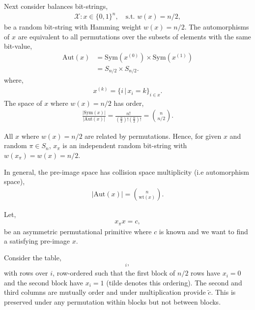 \documentclass[twocolumn, aps, amsmath, amssymb, nofootinbib, superscriptaddress, longbibliography, doublefloatfix, table-of-contents, eqsecnum, rmp]{revtex4-2}
\makeatletter
\newcommand{\soplus}{{{\hspace{1pt}}{\mathbin{\mathpalette\make@small{\mathbin\oplus}}}}{\hspace{1pt}}}
\newcommand{\make@small}[2]{%
  \vcenter{\hbox{%
    \scalebox{0.6}{$\m@th#1#2$}%
  }}%
}
\makeatother
\begin{document}
Next consider balances bit-strings,
\begin{align}
	\mathcal{X}: x\in\{0,1\}^n,\quad \mathrm{s.t.}\,\,w(x)=n/2,
\end{align}
be a random bit-string with Hamming weight \mbox{$w(x)=n/2$}. The automorphisms of $x$ are equivalent to all permutations over the subsets of elements with the same bit-value,
\begin{align}
	\mathrm{Aut}(x) &= \mathrm{Sym}(x^{(0)}) \times \mathrm{Sym}(x^{(1)}) \nonumber\\
	&= S_{n/2}\times S_{n/2}.
\end{align}
where,
\begin{align}
	x^{(k)}=\{i\,|\, x_i=k\}_{i\in x}.
\end{align}
The space of $x$ where $w(x)=n/2$ has order,
\begin{align}
	\frac{|\mathrm{Sym}(x)|}{|\mathrm{Aut}(x)|} = \frac{n!}{(\frac{n}{2})!(\frac{n}{2})!} = \binom{n}{n/2}.
\end{align}

All $x$ where $w(x)=n/2$ are related by permutations. Hence, for given $x$ and random $\pi\in S_n$, $x_\pi$ is an independent random bit-string with $w(x_\pi)=w(x)=n/2$.

In general, the pre-image space has collision space multiplicity (i.e automorphism space),
\begin{align}
	|\mathrm{Aut}(x)| = \binom{n}{\mathrm{wt}(x)}.
\end{align}


Let,
\begin{align}
	x_\pi x = c,
\end{align}
be an asymmetric permutational primitive where $c$ is known and we want to find a satisfying pre-image $x$.

Consider the table,
\begin{align}
	[x_\pi,\tilde{x},\tilde{x}\soplus \tilde{c}]_i,
\end{align}
with rows over $i$, row-ordered such that the first block of $n/2$ rows have $x_i=0$ and the second block have $x_i=1$ (tilde denotes this ordering). The second and third columns are mutually order and under multiplication provide $\tilde{c}$. This is preserved under any permutation within blocks but not between blocks.
\end{document}
